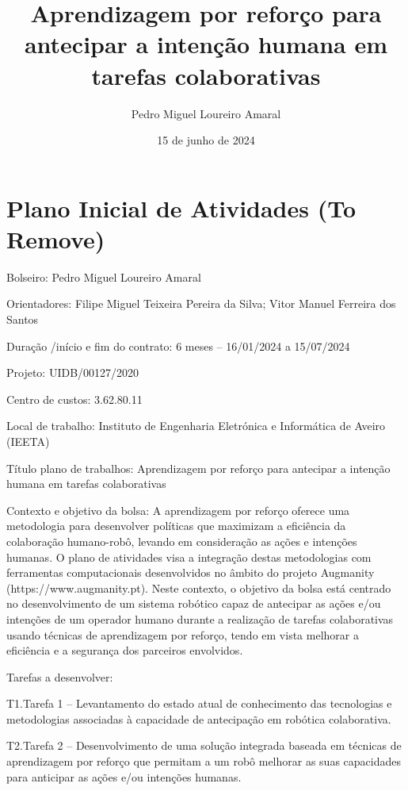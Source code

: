\documentclass[a4paper]{report}
\title{Aprendizagem por reforço para antecipar a intenção humana em tarefas colaborativas}
\author{Pedro Miguel Loureiro Amaral}
\date{15 de junho de 2024}
\begin{document}
\maketitle

\renewcommand\thesection{\arabic{section}}







\color{red}

\section{Plano Inicial de Atividades (To Remove)}

Bolseiro: Pedro Miguel Loureiro Amaral

Orientadores: Filipe Miguel Teixeira Pereira da Silva; Vitor Manuel Ferreira dos Santos

Duração /início e fim do contrato: 6 meses – 16/01/2024 a 15/07/2024

Projeto: UIDB/00127/2020

Centro de custos: 3.62.80.11

Local de trabalho: Instituto de Engenharia Eletrónica e Informática de Aveiro (IEETA)

Título plano de trabalhos: Aprendizagem por reforço para antecipar a intenção humana em tarefas colaborativas

Contexto e objetivo da bolsa: A aprendizagem por reforço oferece uma metodologia para desenvolver políticas que maximizam a eficiência da colaboração humano-robô, levando em consideração as ações e intenções humanas. O plano de atividades visa a integração destas metodologias com ferramentas computacionais desenvolvidos no âmbito do projeto Augmanity (https://www.augmanity.pt). Neste contexto, o objetivo da bolsa está centrado no desenvolvimento de um sistema robótico capaz de antecipar as ações e/ou intenções de um operador humano durante a realização de tarefas colaborativas usando técnicas de aprendizagem por reforço, tendo em vista melhorar a eficiência e a segurança dos parceiros envolvidos.

Tarefas a desenvolver:

T1.Tarefa 1 – Levantamento do estado atual de conhecimento das tecnologias e metodologias associadas à capacidade de antecipação em robótica colaborativa.

T2.Tarefa 2 – Desenvolvimento de uma solução integrada baseada em técnicas de aprendizagem por reforço que permitam a um robô melhorar as suas capacidades para anticipar as ações e/ou intenções humanas.
\end{document}
